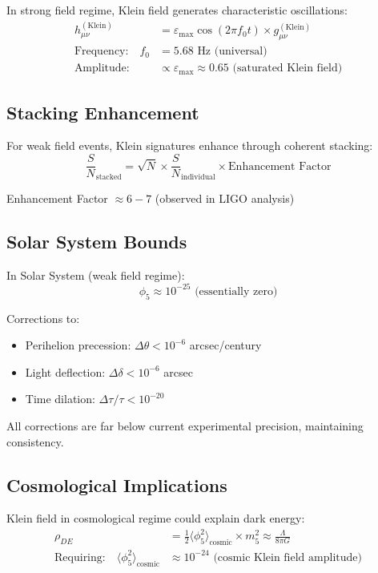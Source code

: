 \documentclass[12pt]{iopart}
\begin{document}
In strong field regime, Klein field generates characteristic oscillations:
\begin{align}
h_{\mu\nu}^{(\text{Klein})} &= \varepsilon_{\max} \cos(2\pi f_0 t) \times g_{\mu\nu}^{(\text{Klein})}\\
\text{Frequency:} \quad f_0 &= 5.68 \text{ Hz (universal)}\\
\text{Amplitude:} \quad &\propto \varepsilon_{\max} \approx 0.65 \text{ (saturated Klein field)}
\end{align}

\subsection{Stacking Enhancement}

For weak field events, Klein signatures enhance through coherent stacking:
\begin{equation}
\frac{S}{N}_{\text{stacked}} = \sqrt{N} \times \frac{S}{N}_{\text{individual}} \times \text{Enhancement Factor}
\end{equation}

Enhancement Factor $\approx 6-7$ (observed in LIGO analysis)

\subsection{Solar System Bounds}

In Solar System (weak field regime):
\begin{equation}
\phi_5 \approx 10^{-25} \text{ (essentially zero)}
\end{equation}

Corrections to:
\begin{itemize}
\item Perihelion precession: $\Delta\theta < 10^{-6}$ arcsec/century
\item Light deflection: $\Delta\delta < 10^{-6}$ arcsec
\item Time dilation: $\Delta\tau/\tau < 10^{-20}$
\end{itemize}

All corrections are far below current experimental precision, maintaining consistency.

\subsection{Cosmological Implications}

Klein field in cosmological regime could explain dark energy:
\begin{align}
\rho_{DE} &= \frac{1}{2}\langle\phi_5^2\rangle_{\text{cosmic}} \times m_5^2 \approx \frac{\Lambda}{8\pi G}\\
\text{Requiring:} \quad \langle\phi_5^2\rangle_{\text{cosmic}} &\approx 10^{-24} \text{ (cosmic Klein field amplitude)}
\end{align}
\end{document}
